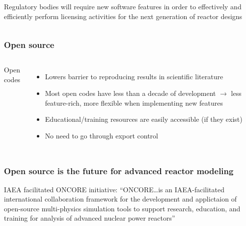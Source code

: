 \begin{frame}
\begin{columns}
        \column[t]{5cm}
        Regulatory bodies will require new software features in order to effectively and efficiently perform licensing activities for the next generation of reactor designs\cite{usnrc_nonlwr_2020-1}
    \end{columns}

\end{frame}

\begin{frame}
    \frametitle{Open source}
    \begin{columns}
        \column[t]{5cm}
        Open codes
        \begin{itemize}
            \item Lowers barrier to reproducing results in scientific literature
            \item Most open codes have less than a decade of development $\rightarrow$ less feature-rich, more flexible when implementing new features
            \item Educational/training resources are easily accessible (if they exist)
            \item No need to go through export control
        \end{itemize}

        \column[t]{5cm}

    \end{columns}

\end{frame}

\begin{frame}
    \frametitle{Open source is the future for advanced reactor modeling}
    \Gls{IAEA} facilitated \Gls{ONCORE} initiative\cite{fiorina_initiative_2021}:
    \newline
    \newline
    \noindent ``ONCORE\ldots is an IAEA-facilitated international collaboration framework for the development and applictaion of open-source multi-physics simulation tools to support research, education, and training for analysis of advanced nuclear power reactors''\cite{iaea_open-source}

\end{frame}

